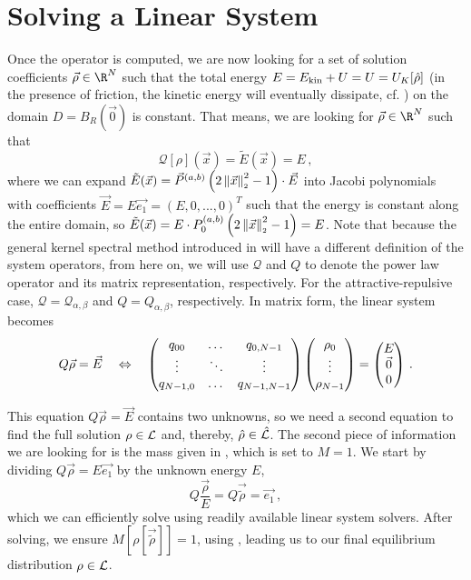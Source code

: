 \section{Solving a Linear System}
Once the operator is computed, we are now looking for a set of solution coefficients $\vec{\rho} \in \R^N$ such that the total energy $E = E_{\rm kin} + U = U = U_K[\hat{\rho}]$ (in the presence of friction, the kinetic energy will eventually dissipate, cf. ) on the domain $D = B_R(\vec{0})$ is constant.
That means, we are looking for $\vec{\rho} \in \R^N$ such that
\begin{equation}
  \mathcal{Q}[\rho](\vec{x}) = \tilde{E}(\vec{x}) = E\,,
\end{equation}
where we can expand $\tilde{E}(\vec{x}) = \vec{P}^{(a, b)}\left(2 \left\lVert\vec{x}\right\rVert_{\scriptscriptstyle 2}^2 - 1\right) \cdot \vec{E}$ into Jacobi polynomials with coefficients $\vec{E} = E \vec{e_1} = (E, 0, ..., 0)^T$ such that the energy is constant along the entire domain, so $\tilde{E}(\vec{x}) = E \cdot P_0^{(a, b)}\left(2 \left\lVert\vec{x}\right\rVert_{\scriptscriptstyle 2}^2 - 1\right) = E$.
Note that because the general kernel spectral method introduced in  will have a different definition of the system operators, from here on, we will use $\mathcal{Q}$ and $Q$ to denote the power law operator and its matrix representation, respectively.
For the attractive-repulsive case, $\mathcal{Q} = \mathcal{Q}_{\alpha,\beta}$ and $Q = Q_{\alpha,\beta}$, respectively.
In matrix form, the linear system becomes
$$Q \vec{\rho} = \vec{E} \quad\Leftrightarrow\quad \begin{pmatrix}
    q_{00}    & \dots  & q_{0,N-1}   \\
    \vdots    & \ddots & \vdots      \\
    q_{N-1,0} & \dots  & q_{N-1,N-1} \\
  \end{pmatrix} \begin{pmatrix}
    \rho_0 \\
    \vdots \\
    \rho_{N-1}
  \end{pmatrix} = \begin{pmatrix}
    E       \\
    \vec{0} \\
    0
  \end{pmatrix}\,.$$

This equation $Q \vec{\rho} = \vec{E}$ contains two unknowns, so we need a second equation to find the full solution $\rho \in \mathcal{L}$ and, thereby, $\hat{\rho} \in \hat{\mathcal{L}}$.
The second piece of information we are looking for is the mass given in , which is set to $M = 1$. We start by dividing $Q \vec{\rho} = E \vec{e_1}$ by the unknown energy $E$,
\begin{equation}
  Q \frac{\vec{\rho}}{E} = Q \vec{\tilde{\rho}} = \vec{e_1}\,,
  \label{eq:the-linear-system}
\end{equation}
which we can efficiently solve using readily available linear system solvers.
After solving, we ensure $M\left[\rho[\vec{\tilde{\rho}}]\right] = 1$, using , leading us to our final equilibrium distribution $\rho \in \mathcal{L}$.

